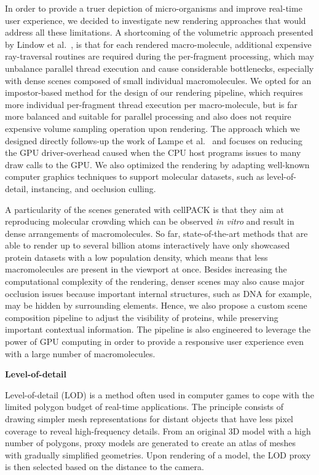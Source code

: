 In order to provide a truer depiction of micro-organisms and improve real-time user experience, we decided to investigate new rendering approaches that would address all these limitations.
A shortcoming of the volumetric approach presented by Lindow et al.~\cite{lindow2012interactive}, is that for each rendered macro-molecule, additional expensive ray-traversal routines are required during the per-fragment processing, which may unbalance parallel thread execution and cause considerable bottlenecks, especially with dense scenes composed of small individual macromolecules.
We opted for an impostor-based method for the design of our rendering pipeline, which requires more individual per-fragment thread execution per macro-molecule, but is far more balanced and suitable for parallel processing and also does not require expensive volume sampling operation upon rendering. 
The approach which we designed directly follows-up the work of Lampe et al.~\cite{lampe2007two} and focuses on reducing the GPU driver-overhead caused when the CPU host programs issues to many draw calls to the GPU.
We also optimized the rendering by adapting well-known computer graphics techniques to support molecular datasets, such as level-of-detail, instancing, and occlusion culling. 

A particularity of the scenes generated with cellPACK is that they aim at reproducing molecular crowding which can be observed \textit{in vitro} and result in dense arrangements of macromolecules.
So far, state-of-the-art methods that are able to render up to several billion atoms interactively have only showcased protein datasets with a low population density, which means that less macromolecules are present in the viewport at once.
Besides increasing the computational complexity of the rendering, denser scenes may also cause major occlusion issues because important internal structures, such as DNA for example, may be hidden by surrounding elements.
Hence, we also propose a custom scene composition pipeline to adjust the visibility of proteins, while preserving important contextual information.
The pipeline is also engineered to leverage the power of GPU computing in order to provide a responsive user experience even with a large number of macromolecules.

\textbf{Level-of-detail}

Level-of-detail (LOD) is a method often used in computer games to cope with the limited polygon budget of real-time applications.
The principle consists of drawing simpler mesh representations for distant objects that have less pixel coverage to reveal high-frequency details. 
From an original 3D model with a high number of polygons, proxy models are generated to create an atlas of meshes with gradually simplified geometries.
Upon rendering of a model, the LOD proxy is then selected based on the distance to the camera.

